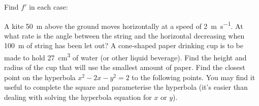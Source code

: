 \begin{questions}
  \question Find $ f' $ in each case:
  \question A kite \SI{50}{\metre} above the ground moves horizontally at a speed of \SI{2}{\metre\per\second}. At
            what rate is the angle between the string and the horizontal decreasing when \SI{100}{\metre} of string
            has been let out?
  \question A cone-shaped paper drinking cup is to be made to hold \SI{27}{\centi\metre\cubed} of water (or other liquid
            beverage). Find the height and radius of the cup that will use the smallest amount of paper.
  \question Find the closest point on the hyperbola $ x^2 - 2x - y^2 = 2 $ to the following points.
            You may find it useful to complete the square and parameterise the hyperbola (it's easier than dealing with
            solving the hyperbola equation for $ x $ or $ y $).
\end{questions}


